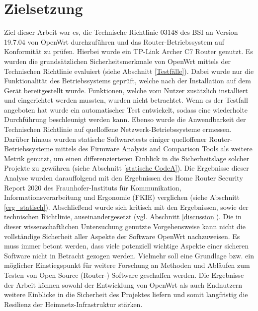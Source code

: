 \documentclass[a4paper]{book}
\begin{document}
\begin{large}
\begin{onehalfspace}
\end{onehalfspace}


\section{Zielsetzung}	
\begin{onehalfspace}
Ziel dieser Arbeit war es, die Technische Richtlinie 03148 des BSI an Version 19.7.04 von OpenWrt durchzuführen und das Router-Betriebssystem auf Konformität zu prüfen. Hierbei wurde ein TP-Link Archer C7 Router genutzt. Es wurden die grundsätzlichen Sicherheitsmerkmale von OpenWrt mittels der Technischen Richtlinie evaluiert (siehe Abschnitt \ref{Testfälle}). Dabei wurde nur die Funktionalität des Betriebssystems geprüft, welche nach der \mbox Installation auf dem Gerät bereitgestellt wurde. Funktionen, welche vom Nutzer zusätzlich installiert und eingerichtet werden mussten, wurden nicht betrachtet. Wenn es der Testfall angeboten hat wurde ein automatischer Test entwickelt, sodass eine wiederholte Durchführung beschleunigt werden kann. Ebenso wurde die Anwendbarkeit der Technischen Richtlinie auf quelloffene Netzwerk-Betriebssysteme ermessen. Darüber hinaus wurden statische Softwaretests einiger quelloffener Router-Betriebssysteme mittels des \glqq Firmware Analysis and \mbox Comparison Tools\grqq{} als weitere Metrik genutzt, um einen differenzierteren Einblick in die Sicherheitslage solcher Projekte zu gewähren (siehe Abschnitt \ref{statische CodeA}). Die Ergebnisse dieser Analyse wurden darauffolgend mit den Ergebnissen des \glqq Home Router Security Report 2020\grqq{} des Fraunhofer-Instituts für Kommunikation, Informationsverarbeitung und Ergonomie (FKIE) verglichen (siehe Abschnitt \ref{erg_statisch}). Abschließend wurde sich kritisch mit den Ergebnissen, sowie der technischen Richtlinie, auseinandergesetzt (vgl. Abschnitt \ref{discussion}).  Die in dieser wissenschaftlichen Untersuchung genutzte Vorgehensweise kann nicht die vollständige Sicherheit aller Aspekte der Software OpenWrt nachzuweisen. Es muss immer betont werden, dass viele potenziell wichtige Aspekte einer sicheren Software nicht in Betracht gezogen \mbox werden. Vielmehr soll eine Grundlage bzw. ein möglicher Einstiegspunkt für weitere Forschung an Methoden und Abläufen zum Testen von Open Source (Router-) Software geschaffen \mbox werden. Die Ergebnisse der Arbeit können sowohl der Entwicklung von OpenWrt als auch Endnutzern weitere Einblicke in die Sicherheit des Projektes liefern und somit langfristig die Resilienz der Heimnetz-Infrastruktur stärken. 


\end{onehalfspace}
\end{large}
\end{document}
